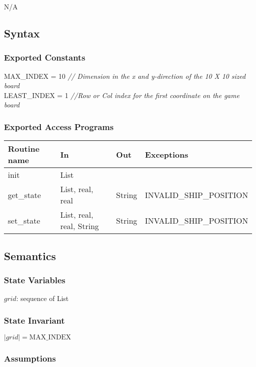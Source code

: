 \documentclass[12pt]{article}
\begin{document}
N/A

\subsection* {Syntax}

\subsubsection* {Exported Constants}

MAX\_INDEX = 10 {\it // Dimension in the x and y-direction of the 10 X 10 sized board}\\
LEAST\_INDEX = 1 {\it //Row or Col index for the first coordinate on the game board}


\subsubsection* {Exported Access Programs}

\begin{tabular}{| l | l | l | l |}
\hline
\textbf{Routine name} & \textbf{In} & \textbf{Out} & \textbf{Exceptions}\\
\hline
init & List &  & ~\\
\hline
get\_state & List, real, real & String & INVALID\_SHIP\_POSITION\\
\hline
set\_state & List, real, real, String & String & INVALID\_SHIP\_POSITION\\
\hline

\end{tabular}

\subsection* {Semantics}

\subsubsection* {State Variables}

$grid$: sequence of List\\

\subsubsection* {State Invariant}
$| grid |  =  \mbox{MAX\_INDEX}$

\subsubsection* {Assumptions}
\end{document}
